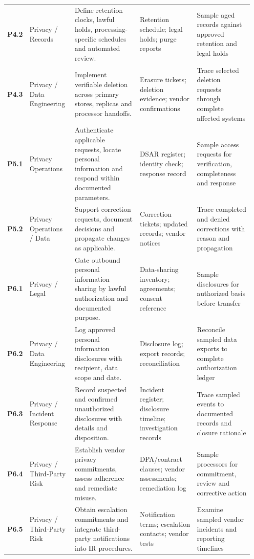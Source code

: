\documentclass[10pt,oneside]{report}
\begin{document}
\begin{landscape}
\begin{longtable}{@{}>{\raggedright\arraybackslash}p{0.6in}>{\raggedright\arraybackslash}p{1.0in}>{\raggedright\arraybackslash}p{2.5in}>{\raggedright\arraybackslash}p{2.35in}>{\raggedright\arraybackslash}p{2.20in}@{}}
\addlinespace[5pt]
\textbf{P4.2} & Privacy / Records & Define retention clocks, lawful holds, processing-specific schedules and automated review. & Retention schedule; legal holds; purge reports & Sample aged records against approved retention and legal holds \\
\addlinespace[5pt]
\textbf{P4.3} & Privacy / Data Engineering & Implement verifiable deletion across primary stores, replicas and processor handoffs. & Erasure tickets; deletion evidence; vendor confirmations & Trace selected deletion requests through complete affected systems \\
\addlinespace[5pt]
\textbf{P5.1} & Privacy Operations & Authenticate applicable requests, locate personal information and respond within documented parameters. & DSAR register; identity check; response record & Sample access requests for verification, completeness and response \\
\addlinespace[5pt]
\textbf{P5.2} & Privacy Operations / Data & Support correction requests, document decisions and propagate changes as applicable. & Correction tickets; updated records; vendor notices & Trace completed and denied corrections with reason and propagation \\
\addlinespace[5pt]
\textbf{P6.1} & Privacy / Legal & Gate outbound personal information sharing by lawful authorization and documented purpose. & Data-sharing inventory; agreements; consent reference & Sample disclosures for authorized basis before transfer \\
\addlinespace[5pt]
\textbf{P6.2} & Privacy / Data Engineering & Log approved personal information disclosures with recipient, data scope and date. & Disclosure log; export records; reconciliation & Reconcile sampled data exports to complete authorization ledger \\
\addlinespace[5pt]
\textbf{P6.3} & Privacy / Incident Response & Record suspected and confirmed unauthorized disclosures with details and disposition. & Incident register; disclosure timeline; investigation records & Trace sampled events to documented records and closure rationale \\
\addlinespace[5pt]
\textbf{P6.4} & Privacy / Third-Party Risk & Establish vendor privacy commitments, assess adherence and remediate misuse. & DPA/contract clauses; vendor assessments; remediation log & Sample processors for commitment, review and corrective action \\
\addlinespace[5pt]
\textbf{P6.5} & Privacy / Third-Party Risk & Obtain escalation commitments and integrate third-party notifications into IR procedures. & Notification terms; escalation contacts; vendor tests & Examine sampled vendor incidents and reporting timelines \\

\end{longtable}
\end{landscape}
\end{document}
